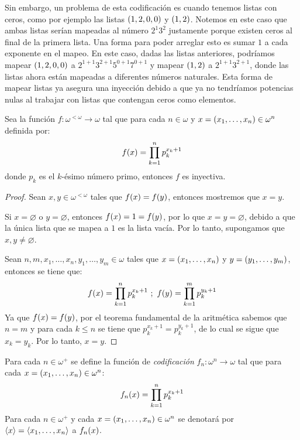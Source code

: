 Sin embargo, un problema de esta codificación es cuando tenemos listas con ceros, como por ejemplo las listas $\pa*{1, 2, 0, 0}$ y $\pa*{1, 2}$. Notemos en este caso que ambas listas serían mapeadas al número $2^{1}3^{2}$ justamente porque existen ceros al final de la primera lista. Una forma para poder arreglar esto es sumar $1$ a cada exponente en el mapeo. En este caso, dadas las listas anteriores, podríamos mapear $\pa*{1, 2, 0, 0}$ a $2^{1 + 1}3^{2 + 1}5^{0 + 1}7^{0 + 1}$ y mapear $\pa*{1, 2}$ a $2^{1 + 1}3^{2 + 1}$, donde las listas ahora están mapeadas a diferentes números naturales. Esta forma de mapear listas ya asegura una inyección debido a que ya no tendríamos potencias nulas al trabajar con listas que contengan ceros como elementos.

\begin{theorem}
	\label{theo: codificacion_inyectiva} %
	Sea la función $f:\omega^{<\omega}\to\omega$ tal que para cada $n\in\omega$ y $x =\pa*{x_{1},\dotsc, x_{n}}\in\omega^{n}$ definida por:
	\[
		f\pa*{x} =\prod_{k = 1}^{n}p_{k}^{x_{k} + 1}
	\]
	donde $p_{k}$ es el $k$-ésimo número primo, entonces $f$ es inyectiva.
\end{theorem}

\begin{proof}
	Sean $x, y\in\omega^{<\omega}$ tales que $f\pa*{x} = f\pa*{y}$, entonces mostremos que $x = y$.

	Si $x =\varnothing$ o $y =\varnothing$, entonces $f\pa*{x} = 1 = f\pa*{y}$, por lo que $x = y =\varnothing$, debido a que la única lista que se mapea a $1$ es la lista vacía. Por lo tanto, supongamos que $x, y\neq\varnothing$.

	Sean $n, m, x_{1},\dotsc, x_{n}, y_{1},\dots, y_{m}\in\omega$ tales que $x =\pa*{x_{1},\dotsc, x_{n}}$ y $y =\pa*{y_{1},\dotsc, y_{m}}$, entonces se tiene que:
	\[
		f\pa*{x} =\prod_{k = 1}^{n}p_{k}^{x_{k} + 1}\ ;\ f\pa*{y} =\prod_{k = 1}^{m}p_{k}^{y_{k} + 1}
	\]
	Ya que $f\pa*{x} = f\pa*{y}$, por el teorema fundamental de la aritmética sabemos que $n = m$ y para cada $k\leq n$ se tiene que $p_{k}^{x_{k} + 1} = p_{k}^{y_{k} + 1}$, de lo cual se sigue que $x_{k} = y_{k}$. Por lo tanto, $x = y$.
\end{proof}

\begin{definition}
	Para cada $n\in\omega^{+}$ se define la función de \emph{codificación} $f_{n}:\omega^{n}\to\omega$ tal que para cada $x =\pa*{x_{1},\dotsc, x_{n}}\in\omega^{n}$:
	\[
		f_{n}\pa*{x} =\prod_{k = 1}^{n}p_{k}^{x_{k} + 1}
	\]
	Para cada $n\in\omega^{+}$ y cada $x =\pa*{x_{1},\dotsc, x_{n}}\in\omega^{n}$ se denotará por $\inner*{x} =\inner*{x_{1},\dotsc, x_{n}}$ a $f_{n}\pa*{x}$.
\end{definition}

